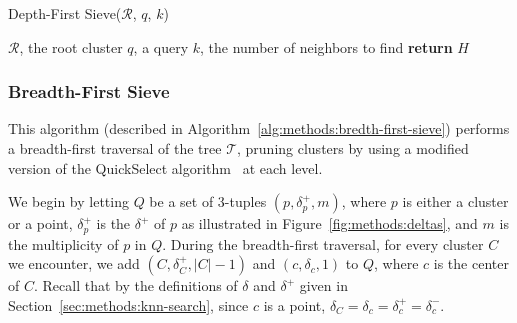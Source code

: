 \begin{minipage}{0.425\textwidth}
    \begin{algorithm}[H]\small
        \caption{Depth-First Sieve($\mathcal{R}$, $q$, $k$)}
        \label{alg:methods:depth-first-sieve}
        \begin{algorithmic}
            \Require $\mathcal{R}$, the root cluster
            \Require $q$, a query
            \Require $k$, the number of neighbors to find
                \EndWhile
                \EndFor
            \EndWhile
            \State \textbf{return} $H$
        \end{algorithmic}
    \end{algorithm}
\end{minipage}


\subsubsection{Breadth-First Sieve}
\label{sec:methods:knn-search:bredth-first-sieve}

This algorithm (described in Algorithm~\ref{alg:methods:bredth-first-sieve}) performs a breadth-first traversal of the tree $\mathcal{T}$, pruning clusters by using a modified version of the QuickSelect algorithm~\cite{hoare1961algorithm} at each level.

We begin by letting $Q$ be a set of 3-tuples $(p, \delta^{+}_{p}, m)$, where $p$ is either a cluster or a point, $\delta^{+}_{p}$ is the $\delta^{+}$ of $p$ as illustrated in Figure~\ref{fig:methods:deltas}, and $m$ is the multiplicity of $p$ in $Q$.
During the breadth-first traversal, for every cluster $C$ we encounter, we add $(C, \delta^{+}_{C}, |C| - 1)$ and $(c, \delta_{c}, 1)$ to $Q$, where $c$ is the center of $C$.
Recall that by the definitions of $\delta$ and $\delta^{+}$ given in Section~\ref{sec:methods:knn-search}, since $c$ is a point, $\delta_{C} = \delta_{c} = \delta^{+}_{c} = \delta^{-}_{c}$.

